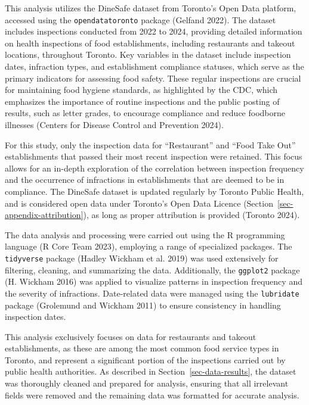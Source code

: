 \documentclass[
  letterpaper,
  DIV=11,
  numbers=noendperiod]{scrartcl}
\begin{document}
This analysis utilizes the DineSafe dataset from Toronto's Open Data
platform, accessed using the \texttt{opendatatoronto} package (Gelfand
2022). The dataset includes inspections conducted from 2022 to 2024,
providing detailed information on health inspections of food
establishments, including restaurants and takeout locations, throughout
Toronto. Key variables in the dataset include inspection dates,
infraction types, and establishment compliance statuses, which serve as
the primary indicators for assessing food safety. These regular
inspections are crucial for maintaining food hygiene standards, as
highlighted by the CDC, which emphasizes the importance of routine
inspections and the public posting of results, such as letter grades, to
encourage compliance and reduce foodborne illnesses (Centers for Disease
Control and Prevention 2024).

For this study, only the inspection data for ``Restaurant'' and ``Food
Take Out'' establishments that passed their most recent inspection were
retained. This focus allows for an in-depth exploration of the
correlation between inspection frequency and the occurrence of
infractions in establishments that are deemed to be in compliance. The
DineSafe dataset is updated regularly by Toronto Public Health, and is
considered open data under Toronto's Open Data Licence
(Section~\ref{sec-appendix-attribution}), as long as proper attribution
is provided (Toronto 2024).

The data analysis and processing were carried out using the R
programming language (R Core Team 2023), employing a range of
specialized packages. The \texttt{tidyverse} package (Hadley Wickham et
al. 2019) was used extensively for filtering, cleaning, and summarizing
the data. Additionally, the \texttt{ggplot2} package (H. Wickham 2016)
was applied to visualize patterns in inspection frequency and the
severity of infractions. Date-related data were managed using the
\texttt{lubridate} package (Grolemund and Wickham 2011) to ensure
consistency in handling inspection dates.

This analysis exclusively focuses on data for restaurants and takeout
establishments, as these are among the most common food service types in
Toronto, and represent a significant portion of the inspections carried
out by public health authorities. As described in
Section~\ref{sec-data-results}, the dataset was thoroughly cleaned and
prepared for analysis, ensuring that all irrelevant fields were removed
and the remaining data was formatted for accurate analysis.
\end{document}
